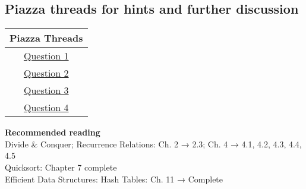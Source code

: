 \documentclass[12pt]{article}
\begin{document}
\hrulefill
\pagebreak

\subsection*{Piazza threads for hints and further discussion}
\begin{center}
    \begin{tabular}{|c|}
    \hline
    Piazza Threads \\ [0.5ex] 
    \hline \hline 
    \href{https://piazza.com/class/ka2roz7rb9m3j4?cid=36}{Question 1}\\
    \href{https://piazza.com/class/ka2roz7rb9m3j4?cid=37}{Question 2}\\
    \href{https://piazza.com/class/ka2roz7rb9m3j4?cid=38}{Question 3}\\
     \href{https://piazza.com/class/ka2roz7rb9m3j4?cid=39}{Question 4}\\
    
    \hline
    \end{tabular}
\end{center}

\textbf{Recommended reading}\\
Divide & Conquer; Recurrence Relations: Ch. 2 →  2.3; Ch. 4 →  4.1, 4.2, 4.3, 4.4, 4.5 \\
Quicksort: Chapter 7 complete \\
Efficient Data Structures: Hash Tables: Ch. 11 →  Complete \\


\pagebreak
\end{document}
